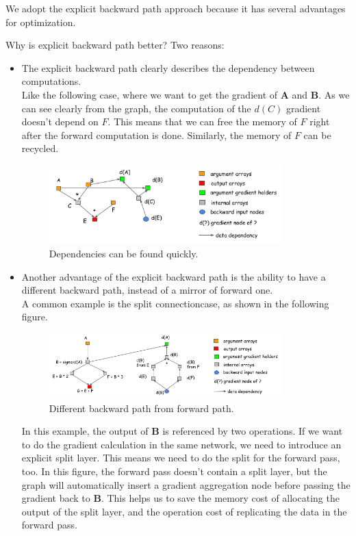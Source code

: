 We adopt the explicit backward path approach because it has several advantages for optimization.

Why is explicit backward path better? Two reasons:
\begin{itemize}
\item The explicit backward path clearly describes the dependency between computations.\\
Like the following case, where we want to get the gradient of \textbf{A} and \textbf{B}. As we can see clearly from the graph, the computation of the $d(C)$ gradient doesn’t depend on $F$. This means that we can free the memory of $F$ right after the forward computation is done. Similarly, the memory of $F$ can be recycled.
\begin{figure}[!hbtp]
\centering
\includegraphics[width=0.85\textwidth]{MXNet/back_dep_prune}
\caption{Dependencies can be found quickly.}
\end{figure}

\item Another advantage of the explicit backward path is the ability to have a different backward path, instead of a mirror of forward one.\\
A common example is the split connectioncase, as shown in the following figure.
\begin{figure}[!hbtp]
\centering
\includegraphics[width=0.85\textwidth]{MXNet/back_agg_grad}
\caption{Different backward path from forward path.}
\end{figure}
In this example, the output of \textbf{B} is referenced by two operations. If we want to do the gradient calculation in the same network, we need to introduce an explicit split layer. This means we need to do the split for the forward pass, too. In this figure, the forward pass doesn’t contain a split layer, but the graph will automatically insert a gradient aggregation node before passing the gradient back to \textbf{B}. This helps us to save the memory cost of allocating the output of the split layer, and the operation cost of replicating the data in the forward pass.
\end{itemize}

